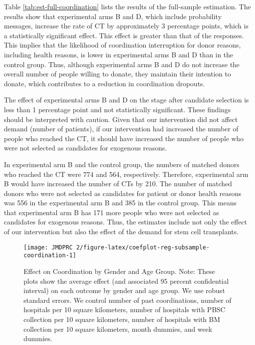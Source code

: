 \documentclass[12pt, a4paper]{article}
\begin{document}
Table \ref{tab:est-full-coordination} lists the results of the full-sample estimation. The results show that experimental arms B and D, which include probability messages, increase the rate of CT by approximately 3 percentage points, which is a statistically significant effect. This effect is greater than that of the responses. This implies that the likelihood of coordination interruption for donor reasons, including health reasons, is lower in experimental arms B and D than in the control group. Thus, although experimental arms B and D do not increase the overall number of people willing to donate, they maintain their intention to donate, which contributes to a reduction in coordination dropouts.

The effect of experimental arms B and D on the stage after candidate selection is less than 1 percentage point and not statistically significant. These findings should be interpreted with caution. Given that our intervention did not affect demand (number of patients), if our intervention had increased the number of people who reached the CT, it should have increased the number of people who were not selected as candidates for exogenous reasons.

In experimental arm B and the control group, the numbers of matched donors who reached the CT were 774 and 564, respectively. Therefore, experimental arm B would have increased the number of CTs by 210. The number of matched donors who were not selected as candidates for patient or donor health reasons was 556 in the experimental arm B and 385 in the control group. This means that experimental arm B has 171 more people who were not selected as candidates for exogenous reasons. Thus, the estimates include not only the effect of our intervention but also the effect of the demand for stem cell transplants.

\begin{figure}[t]
\texttt{[image: JMDPRC~2/figure-latex/coefplot-reg-subsample-coordination-1]} \caption{Effect on Coordination by Gender and Age Group. Note: These plots show the average effect (and associated 95 percent confidential interval) on each outcome by gender and age group. We use robust standard errors. We control number of past coordinations, number of hospitals per 10 square kilometers, number of hospitals with PBSC collection per 10 square kilometers, number of hospitals with BM collection per 10 square kilometers, month dummies, and week dummies.}\label{fig:coefplot-reg-subsample-coordination}
\end{figure}
\end{document}
